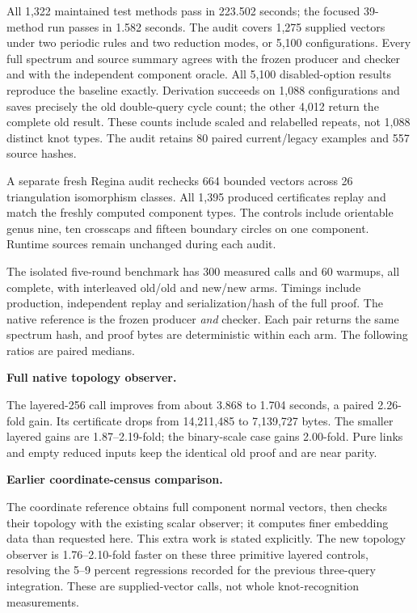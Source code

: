 All 1,322 maintained test methods pass in 223.502 seconds; the focused
39-method run passes in 1.582 seconds. The audit covers 1,275 supplied
vectors under two periodic rules and two reduction modes, or 5,100
configurations. Every full spectrum and source summary agrees with the
frozen  producer and checker and with the independent
component oracle. All 5,100 disabled-option results reproduce the baseline
exactly. Derivation succeeds on 1,088 configurations and saves precisely
the old double-query cycle count; the other 4,012 return the complete old
result. These counts include scaled and relabelled repeats, not 1,088
distinct knot types. The audit retains 80 paired current/legacy examples
and 557 source hashes.

A separate fresh Regina audit rechecks 664 bounded vectors across 26
triangulation isomorphism classes. All 1,395 produced certificates replay
and match the freshly computed component types. The controls include
orientable genus nine, ten crosscaps and fifteen boundary circles on one
component. Runtime sources remain unchanged during each audit.

The isolated five-round benchmark has 300 measured calls and 60 warmups,
all complete, with interleaved old/old and new/new arms. Timings include
production, independent replay and serialization/hash of the full proof.
The native reference is the frozen producer \emph{and} checker. Each pair
returns the same spectrum hash, and proof bytes are deterministic within
each arm. The following ratios are paired medians.

\begin{samepage}
\noindent\textbf{Full native topology observer.}

\end{samepage}

The layered-256 call improves from about 3.868 to 1.704 seconds, a paired
2.26-fold gain. Its certificate drops from 14,211,485 to 7,139,727 bytes.
The smaller layered gains are 1.87--2.19-fold; the binary-scale case gains
2.00-fold. Pure links and empty reduced inputs keep the identical old
proof and are near parity.

\begin{samepage}
\noindent\textbf{Earlier coordinate-census comparison.}

\end{samepage}

The coordinate reference obtains full component normal vectors, then checks
their topology with the existing scalar observer; it computes finer
embedding data than requested here. This extra work is stated explicitly.
The new topology observer is 1.76--2.10-fold faster on these three primitive
layered controls, resolving the 5--9 percent regressions recorded for the
previous three-query integration. These are supplied-vector calls, not
whole knot-recognition measurements.

